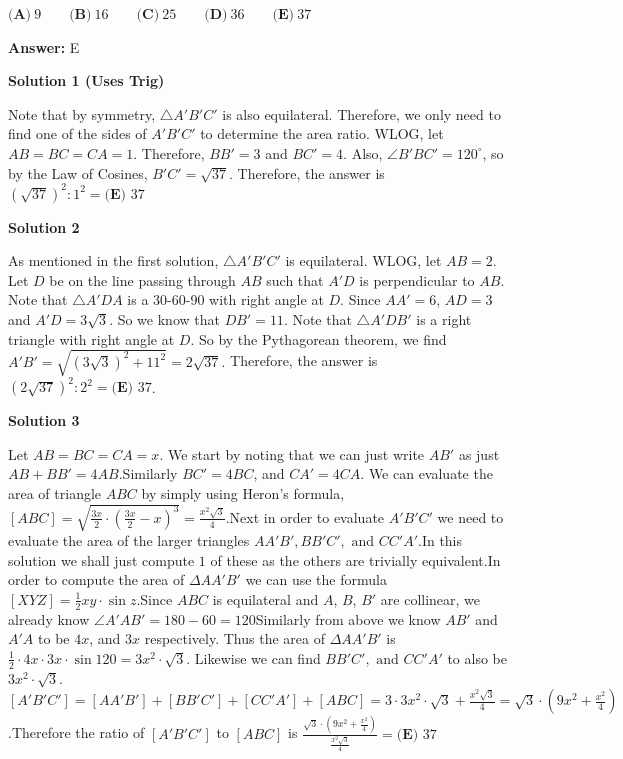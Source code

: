 \begin{enumerate}
 $\textbf{(A)}\ 9\qquad\textbf{(B)}\ 16\qquad\textbf{(C)}\ 25\qquad\textbf{(D)}\ 36\qquad\textbf{(E)}\ 37$

 \textbf{Answer: }E



\textbf{Solution 1 (Uses Trig)}

Note that by symmetry, $\triangle A'B'C'$ is also equilateral. Therefore, we only need to find one of the sides of $A'B'C'$ to determine the area ratio. WLOG, let $AB = BC = CA = 1$. Therefore, $BB' = 3$ and $BC' = 4$. Also, $\angle B'BC' = 120^{\circ}$, so by the Law of Cosines, $B'C' = \sqrt{37}$. Therefore, the answer is $(\sqrt{37})^2 : 1^2 = \boxed{\textbf{(E) } 37}$




\textbf{Solution 2}

As mentioned in the first solution, $\triangle A'B'C'$ is equilateral. WLOG, let $AB=2$. Let $D$ be on the line passing through $AB$ such that $A'D$ is perpendicular to $AB$. Note that $\triangle A'DA$ is a 30-60-90 with right angle at $D$. Since $AA'=6$, $AD=3$ and $A'D=3\sqrt{3}$. So we know that $DB'=11$. Note that $\triangle A'DB'$ is a right triangle with right angle at $D$. So by the Pythagorean theorem, we find $A'B'= \sqrt{(3\sqrt{3})^2 + 11^2} = 2\sqrt{37}.$ Therefore, the answer is $(2\sqrt{37})^2 : 2^2 = \boxed{\textbf{(E) } 37}$.

 



\textbf{Solution 3}

Let $AB=BC=CA=x$. We start by noting that we can just write $AB'$ as just $AB+BB'=4AB$.Similarly $BC'=4BC$, and $CA'=4CA$. We can evaluate the area of triangle $ABC$ by simply using Heron's formula, $[ABC]=\sqrt{\frac{3x}{2}\cdot {\left(\frac{3x}{2}-x\right)}^3}=\frac{x^2\sqrt{3}}{4}$.Next in order to evaluate $A'B'C'$ we need to evaluate the area of the larger triangles $AA'B',BB'C', \text{ and } CC'A'$.In this solution we shall just compute $1$ of these as the others are trivially equivalent.In order to compute the area of $\Delta{AA'B'}$ we can use the formula $[XYZ]=\frac{1}{2}xy\cdot\sin{z}$.Since $ABC$ is equilateral and $A$, $B$, $B'$ are collinear, we already know $\angle{A'AB'}=180-60=120$Similarly from above we know $AB'$ and $A'A$ to be $4x$, and $3x$ respectively. Thus the area of $\Delta{AA'B'}$ is $\frac{1}{2}\cdot 4x\cdot 3x \cdot \sin{120}=3x^2\cdot\sqrt{3}$. Likewise we can find $BB'C', \text{ and } CC'A'$ to also be $3x^2\cdot\sqrt{3}$.$[A'B'C']=[AA'B']+[BB'C']+[CC'A']+[ABC]=3\cdot3x^2\cdot\sqrt{3}+\frac{x^2\sqrt{3}}{4}=\sqrt{3}\cdot\left(9x^2+\frac{x^2}{4}\right)$.Therefore the ratio of $[A'B'C']$ to $[ABC]$ is $\frac{\sqrt{3}\cdot\left(9x^2+\frac{x^2}{4}\right)}{\frac{x^2\sqrt{3}}{4}}=\boxed{\textbf{(E) } 37}$





\end{enumerate}
